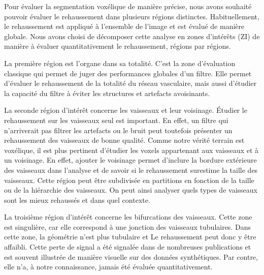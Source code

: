 Pour évaluer la segmentation voxélique de manière précise, nous avons souhaité pouvoir évaluer le rehaussement dans plusieurs régions distinctes. Habituellement, le rehaussement est appliqué à l'ensemble de l'image et est évalué de manière globale. Nous avons choisi de décomposer cette analyse en zones d'intérêts (ZI) de manière à évaluer quantitativement le rehaussement, régions par régions.

La première région est l'organe dans sa totalité. C'est la zone d'évaluation classique qui permet de juger des performances globales d'un filtre. Elle permet d'évaluer le rehaussement de la totalité du réseau vasculaire, mais aussi d'étudier la capacité du filtre à éviter les structures et artefacts avoisinants.

La seconde région d'intérêt concerne les vaisseaux et leur voisinage. Étudier le rehaussement sur les vaisseaux seul est important. En effet, un filtre qui n'arriverait pas filtrer les artefacts ou le bruit peut toutefois présenter un rehaussement des vaisseaux de bonne qualité. Comme notre vérité terrain est voxélique, il est plus pertinent d'étudier les voxels appartenant aux vaisseaux et à un voisinage. En effet, ajouter le voisinage permet d'inclure la bordure extérieure des vaisseaux dans l'analyse et de savoir si le rehaussement surestime la taille des vaisseaux. Cette région peut être subdivisée en partitions en fonction de la taille ou de la hiérarchie des vaisseaux. On peut ainsi analyser quels types de vaisseaux sont les mieux rehaussés et dans quel contexte.

La troisième région d'intérêt concerne les bifurcations des vaisseaux. Cette zone est singulière, car elle correspond à une jonction des vaisseaux tubulaires. Dans cette zone, la géométrie n'est plus tubulaire et Le rehaussement peut donc y être affaibli. Cette perte de signal a été signalée dans de nombreuses publications et est souvent illustrée de manière visuelle sur des données synthétiques. Par contre, elle n'a, à notre connaissance, jamais été évaluée quantitativement.

